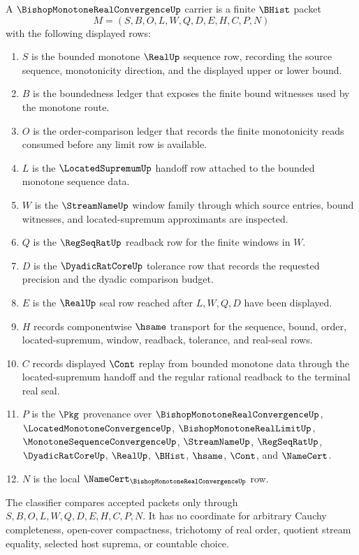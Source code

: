 \begin{definition}
\label{def:bishop-monotone-real-convergence-carrier}
A $\BishopMonotoneRealConvergenceUp$ carrier is a finite $\BHist$ packet
$$
M=(S,B,O,L,W,Q,D,E,H,C,P,N)
$$
with the following displayed rows:
\begin{enumerate}
\item $S$ is the bounded monotone $\RealUp$ sequence row, recording the source sequence, monotonicity direction, and the displayed upper or lower bound.
\item $B$ is the boundedness ledger that exposes the finite bound witnesses used by the monotone route.
\item $O$ is the order-comparison ledger that records the finite monotonicity reads consumed before any limit row is available.
\item $L$ is the $\LocatedSupremumUp$ handoff row attached to the bounded monotone sequence data.
\item $W$ is the $\StreamNameUp$ window family through which source entries, bound witnesses, and located-supremum approximants are inspected.
\item $Q$ is the $\RegSeqRatUp$ readback row for the finite windows in $W$.
\item $D$ is the $\DyadicRatCoreUp$ tolerance row that records the requested precision and the dyadic comparison budget.
\item $E$ is the $\RealUp$ seal row reached after $L,W,Q,D$ have been displayed.
\item $H$ records componentwise $\hsame$ transport for the sequence, bound, order, located-supremum, window, readback, tolerance, and real-seal rows.
\item $C$ records displayed $\Cont$ replay from bounded monotone data through the located-supremum handoff and the regular rational readback to the terminal real seal.
\item $P$ is the $\Pkg$ provenance over $\BishopMonotoneRealConvergenceUp$, $\LocatedMonotoneConvergenceUp$, $\BishopMonotoneRealLimitUp$, $\MonotoneSequenceConvergenceUp$, $\StreamNameUp$, $\RegSeqRatUp$, $\DyadicRatCoreUp$, $\RealUp$, $\BHist$, $\hsame$, $\Cont$, and $\NameCert$.
\item $N$ is the local $\NameCert_{\BishopMonotoneRealConvergenceUp}$ row.
\end{enumerate}
The classifier compares accepted packets only through $S,B,O,L,W,Q,D,E,H,C,P,N$. It has no coordinate for arbitrary Cauchy completeness, open-cover compactness, trichotomy of real order, quotient stream equality, selected host suprema, or countable choice.
\end{definition}

